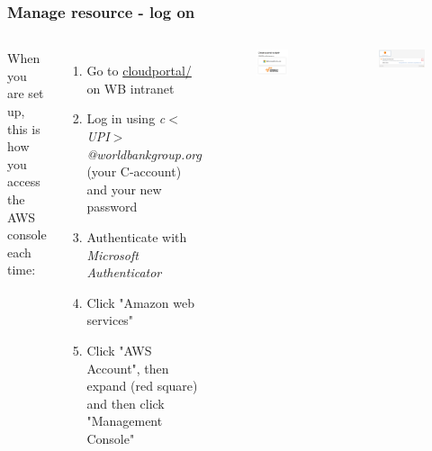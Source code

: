 \documentclass[aspectratio=169]{beamer} %
\begin{document}
\begin{frame}
	\frametitle{Manage resource - log on}
	
	
	\begin{columns}[c]
		
		
		When you are set up, this is how you access the AWS console each time:
		
		\begin{enumerate}
			\item Go to \url{cloudportal/} on WB intranet
			\item Log in using \textit{c$<$UPI$>$@worldbankgroup.org} (your C-account) and your new password
			\item Authenticate with \textit{Microsoft Authenticator}
			\item Click "Amazon web services"
			\item Click "AWS Account", then expand (red square) and then click "Management Console"
			
		\end{enumerate}
		
		\begin{figure}
			\centering
			\includegraphics[width=.5\textwidth]{./img/logon-1.png}
		\end{figure}
		\vspace{.2cm}
		\begin{figure}
			\centering
			\includegraphics[width=1\textwidth]{./img/logon-2.png}
		\end{figure}
	\end{columns}
\end{frame}
\end{document}
